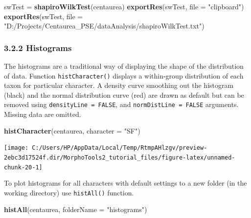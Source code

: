 \documentclass[
]{article}
\newenvironment{Shaded}{\begin{snugshade}}{\end{snugshade}}
\newcommand{\DataTypeTok}[1]{\textcolor[rgb]{0.13,0.29,0.53}{#1}}
\newcommand{\KeywordTok}[1]{\textcolor[rgb]{0.13,0.29,0.53}{\textbf{#1}}}
\newcommand{\NormalTok}[1]{#1}
\newcommand{\StringTok}[1]{\textcolor[rgb]{0.31,0.60,0.02}{#1}}
\begin{document}
\begin{Shaded}
\begin{Highlighting}[]
\NormalTok{swTest =}\StringTok{ }\KeywordTok{shapiroWilkTest}\NormalTok{(centaurea)}
\KeywordTok{exportRes}\NormalTok{(swTest, }\DataTypeTok{file =} \StringTok{"clipboard"}\NormalTok{)}
\KeywordTok{exportRes}\NormalTok{(swTest, }\DataTypeTok{file =} \StringTok{"D:/Projects/Centaurea_PSE/dataAnalysis/shapiroWilkTest.txt"}\NormalTok{)}
\end{Highlighting}
\end{Shaded}

\hypertarget{histograms}{%
\subsubsection{3.2.2 Histograms}\label{histograms}}

The histograms are a traditional way of displaying the shape of the
distribution of data. Function \texttt{histCharacter()} displays a
within-group distribution of each taxon for particular character. A
density curve smoothing out the histogram (black) and the normal
distribution curve (red) are drawn as default but can be removed using
\texttt{densityLine\ =\ FALSE}, and \texttt{normDistLine\ =\ FALSE}
arguments. Missing data are omitted.

\begin{Shaded}
\begin{Highlighting}[]
\KeywordTok{histCharacter}\NormalTok{(centaurea, }\DataTypeTok{character =} \StringTok{"SF"}\NormalTok{)}
\end{Highlighting}
\end{Shaded}

\begin{center}\texttt{[image: C:/Users/HP/AppData/Local/Temp/RtmpAHlzgv/preview-2ebc3d17524f.dir/MorphoTools2\_tutorial\_files/figure-latex/unnamed-chunk-20-1]} \end{center}

To plot histograms for all characters with default settings to a new
folder (in the working directory) use \texttt{histAll()} function.

\begin{Shaded}
\begin{Highlighting}[]
\KeywordTok{histAll}\NormalTok{(centaurea, }\DataTypeTok{folderName =} \StringTok{"histograms"}\NormalTok{)}
\end{Highlighting}
\end{Shaded}
\end{document}
